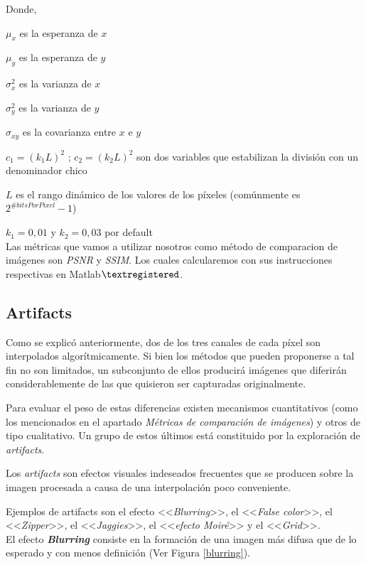 \documentclass[a4paper]{article}
\begin{document}
\noindent Donde, 

$\mu_x$ es la esperanza de $x$

$\mu_y$ es la esperanza de $y$

$\sigma_x^2$ es la varianza de $x$

$\sigma_y^2$ es la varianza de $y$

$\sigma_{xy}$ es la covarianza entre $x$ e $y$

$c_1 = (k_1L)^2$ ; $c_2 = (k_2L)^2$ son dos variables que estabilizan la divisi\'on con un denominador chico

$L$ es el rango din\'amico de los valores de los p\'ixeles (com\'unmente es $2^{\#bitsPorPixel}-1$)

$k_1 = 0,01$ y $k_2 = 0,03$ por default\\

Las m\'etricas que vamos a utilizar nosotros como m\'etodo de comparacion de im\'agenes son \emph{PSNR} y \emph{SSIM}. Los cuales calcularemos con sus instrucciones respectivas en Matlab$\textregistered$.

\newpage
\subsection{Artifacts}

Como se explicó anteriormente, dos de los tres canales de cada p\'ixel son interpolados algorítmicamente. Si bien los métodos que pueden proponerse a tal fin no son limitados, un subconjunto de ellos producirá imágenes que diferirán considerablemente de las que quisieron ser capturadas originalmente. 

Para evaluar el peso de estas diferencias  existen mecanismos cuantitativos (como los mencionados en el apartado \emph{M\'etricas de comparaci\'on de im\'agenes}) y otros de tipo cualitativo. Un grupo de estos últimos está constituido por la exploración de \textit{artifacts}.

Los \textit{artifacts} son efectos visuales indeseados frecuentes que se producen sobre la imagen procesada a causa de una interpolación poco conveniente. 

Ejemplos de artifacts son el efecto <<\emph{Blurring}>>, el <<\emph{False color}>>, el <<\emph{Zipper}>>, el <<\emph{Jaggies}>>,   el <<\emph{efecto Moiré}>> y  el <<\emph{Grid}>>.\\

El efecto \textit{\textbf{Blurring}} consiste en la formación de una imagen más difusa que de lo esperado y con menos definición (Ver Figura \ref{blurring}). \\
\end{document}
